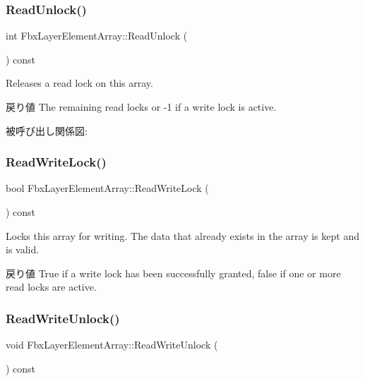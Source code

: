 \subsubsection{\texorpdfstring{Read\+Unlock()}{ReadUnlock()}}
{\footnotesize\ttfamily int Fbx\+Layer\+Element\+Array\+::\+Read\+Unlock (\begin{DoxyParamCaption}{ }\end{DoxyParamCaption}) const}

Releases a read lock on this array. \begin{DoxyReturn}{戻り値}
The remaining read locks or -\/1 if a write lock is active. 
\end{DoxyReturn}
被呼び出し関係図\+:
\mbox{\label{class_fbx_layer_element_array_ab4293e9a5089b1bccdb2843ee6ff30fb}} 
\subsubsection{\texorpdfstring{Read\+Write\+Lock()}{ReadWriteLock()}}
{\footnotesize\ttfamily bool Fbx\+Layer\+Element\+Array\+::\+Read\+Write\+Lock (\begin{DoxyParamCaption}{ }\end{DoxyParamCaption}) const}

Locks this array for writing. The data that already exists in the array is kept and is valid. \begin{DoxyReturn}{戻り値}
{\ttfamily True} if a write lock has been successfully granted, {\ttfamily false} if one or more read locks are active. 
\end{DoxyReturn}
\mbox{\label{class_fbx_layer_element_array_a172d8f3872d50f7dfcdfd8f446cdcf3c}} 
\subsubsection{\texorpdfstring{Read\+Write\+Unlock()}{ReadWriteUnlock()}}
{\footnotesize\ttfamily void Fbx\+Layer\+Element\+Array\+::\+Read\+Write\+Unlock (\begin{DoxyParamCaption}{ }\end{DoxyParamCaption}) const}


